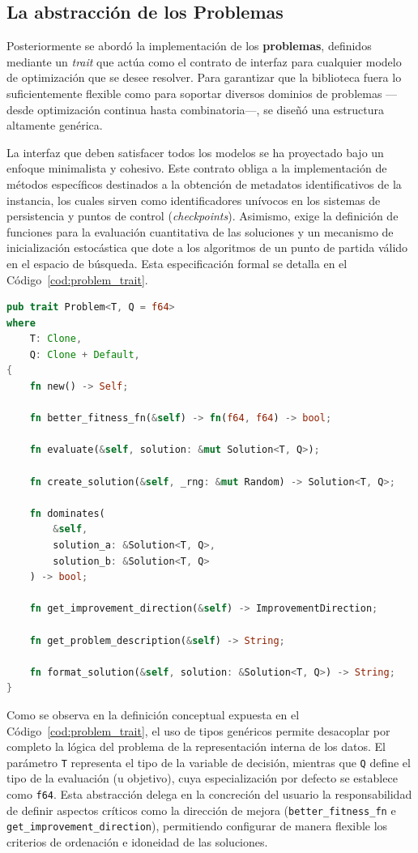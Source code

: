 \documentclass[12pt,a4paper,twoside,openright]{book}
\begin{document}
    \subsection{La abstracción de los Problemas}
        Posteriormente se abordó la implementación de los \textbf{problemas}, definidos mediante un \textit{trait} que actúa como el contrato de interfaz para cualquier modelo de optimización que se desee resolver. Para garantizar que la biblioteca fuera lo suficientemente flexible como para soportar diversos dominios de problemas —desde optimización continua hasta combinatoria—, se diseñó una estructura altamente genérica. 
        
        La interfaz que deben satisfacer todos los modelos se ha proyectado bajo un enfoque minimalista y cohesivo. Este contrato obliga a la implementación de métodos específicos destinados a la obtención de metadatos identificativos de la instancia, los cuales sirven como identificadores unívocos en los sistemas de persistencia y puntos de control (\textit{checkpoints}). Asimismo, exige la definición de funciones para la evaluación cuantitativa de las soluciones y un mecanismo de inicialización estocástica que dote a los algoritmos de un punto de partida válido en el espacio de búsqueda. Esta especificación formal se detalla en el Código~\ref{cod:problem_trait}.


\begin{lstlisting}[language=Rust, caption={Muestra la implementación del \texttt{trait} problema.},label={cod:problem_trait}]
pub trait Problem<T, Q = f64>
where
    T: Clone,
    Q: Clone + Default,
{
    fn new() -> Self;

    fn better_fitness_fn(&self) -> fn(f64, f64) -> bool;
    
    fn evaluate(&self, solution: &mut Solution<T, Q>);
        
    fn create_solution(&self, _rng: &mut Random) -> Solution<T, Q>;
        
    fn dominates(
        &self, 
        solution_a: &Solution<T, Q>, 
        solution_b: &Solution<T, Q>
    ) -> bool;
    
    fn get_improvement_direction(&self) -> ImprovementDirection;

    fn get_problem_description(&self) -> String;

    fn format_solution(&self, solution: &Solution<T, Q>) -> String;
}
\end{lstlisting}

        Como se observa en la definición conceptual expuesta en el Código~\ref{cod:problem_trait}, el uso de tipos genéricos permite desacoplar por completo la lógica del problema de la representación interna de los datos. El parámetro \texttt{T} representa el tipo de la variable de decisión, mientras que \texttt{Q} define el tipo de la evaluación (u objetivo), cuya especialización por defecto se establece como \texttt{f64}. Esta abstracción delega en la concreción del usuario la responsabilidad de definir aspectos críticos como la dirección de mejora (\texttt{better\_fitness\_fn} e \texttt{get\_improvement\_direction}), permitiendo configurar de manera flexible los criterios de ordenación e idoneidad de las soluciones. 
\end{document}

